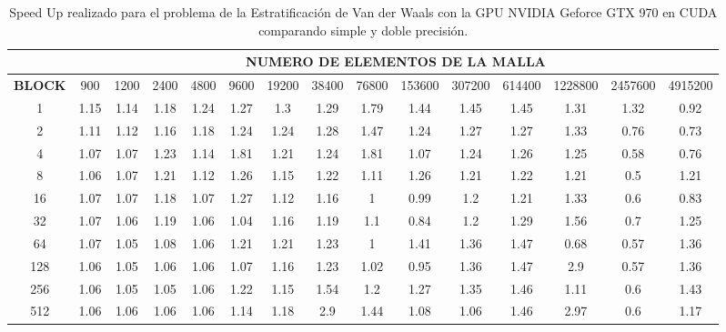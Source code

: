 \begin{table}[]
    \begin{tabular}{|c|c|c|c|c|c|c|c|c|c|c|c|c|c|c|}
    \hline
                   & \multicolumn{14}{c|}{\textbf{NUMERO DE ELEMENTOS DE LA MALLA}}                                                    \\ \hline
    \textbf{BLOCK} & 900  & 1200 & 2400 & 4800 & 9600 & 19200 & 38400 & 76800 & 153600 & 307200 & 614400 & 1228800 & 2457600 & 4915200 \\ \hline
    1              & 1.15 & 1.14 & 1.18 & 1.24 & 1.27 & 1.3   & 1.29  & 1.79  & 1.44   & 1.45   & 1.45   & 1.31    & 1.32    & 0.92    \\ \hline
    2              & 1.11 & 1.12 & 1.16 & 1.18 & 1.24 & 1.24  & 1.28  & 1.47  & 1.24   & 1.27   & 1.27   & 1.33    & 0.76    & 0.73    \\ \hline
    4              & 1.07 & 1.07 & 1.23 & 1.14 & 1.81 & 1.21  & 1.24  & 1.81  & 1.07   & 1.24   & 1.26   & 1.25    & 0.58    & 0.76    \\ \hline
    8              & 1.06 & 1.07 & 1.21 & 1.12 & 1.26 & 1.15  & 1.22  & 1.11  & 1.26   & 1.21   & 1.22   & 1.21    & 0.5     & 1.21    \\ \hline
    16             & 1.07 & 1.07 & 1.18 & 1.07 & 1.27 & 1.12  & 1.16  & 1     & 0.99   & 1.2    & 1.21   & 1.33    & 0.6     & 0.83    \\ \hline
    32             & 1.07 & 1.06 & 1.19 & 1.06 & 1.04 & 1.16  & 1.19  & 1.1   & 0.84   & 1.2    & 1.29   & 1.56    & 0.7     & 1.25    \\ \hline
    64             & 1.07 & 1.05 & 1.08 & 1.06 & 1.21 & 1.21  & 1.23  & 1     & 1.41   & 1.36   & 1.47   & 0.68    & 0.57    & 1.36    \\ \hline
    128            & 1.06 & 1.05 & 1.06 & 1.06 & 1.07 & 1.16  & 1.23  & 1.02  & 0.95   & 1.36   & 1.47   & 2.9     & 0.57    & 1.36    \\ \hline
    256            & 1.06 & 1.05 & 1.05 & 1.06 & 1.22 & 1.15  & 1.54  & 1.2   & 1.27   & 1.35   & 1.46   & 1.11    & 0.6     & 1.43    \\ \hline
    512            & 1.06 & 1.06 & 1.06 & 1.06 & 1.14 & 1.18  & 2.9   & 1.44  & 1.08   & 1.06   & 1.46   & 2.97    & 0.6     & 1.17    \\ \hline    \end{tabular}
    \caption{Speed Up realizado para el problema de la Estratificación de Van der Waals con la GPU NVIDIA Geforce GTX 970 en CUDA comparando simple y doble precisión.}
    \label{tab:c_970_VdW_cuda_10}
    \end{table}